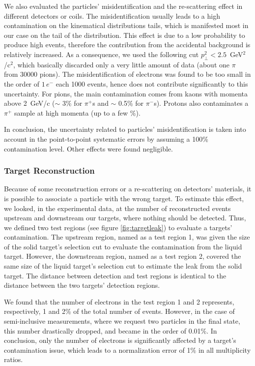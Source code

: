 We also evaluated the particles' misidentification and the re-scattering effect in different detectors or coils. The misidentification usually leads to a high 
contamination on the kinematical distributions tails, which is manifested most in our case on the tail of the \pt distribution. This effect is due to a low probability to produce high \pt events, therefore the contribution from the accidental background is relatively increased. As a consequence, we used the following cut $p_\perp^2 < 2.5$~GeV$^2$/c$^2$, which basically discarded only a very little amount of data (about one $\pi$ from 30000 pions). The misidentification of electrons was found to be too small in the order of $1\,e^-$ each 1000 events, hence does not contribute significantly to this uncertainty. For pions, the main contamination comes from kaons with momenta above 2~GeV/c ($\sim$ 3\% for $\pi^+$s and $\sim$ 0.5\% for $\pi^-$s). Protons also contaminates a $\pi^+$ sample at high momenta (up to a few \%). 

In conclusion, the uncertainty related to particles' misidentification is taken into account in the point-to-point systematic errors by assuming a 100\% contamination level. Other effects were found negligible.

\subsubsection{Target Reconstruction}

Because of some reconstruction errors or a re-scattering on detectors' materials, it 
is possible to associate a particle with the wrong target. To estimate this 
effect, we looked, in the experimental data, at the number of reconstructed events upstream and downstream our targets, where nothing should be detected. Thus, we defined two test regions (see figure \ref{fig:targetleak}) to evaluate a targets' contamination. The upstream region, named as a test region 1, was given the size of the solid target's selection cut to evaluate the contamination from the liquid target. However, the downstream region, named as a test region 2, covered the same size of the liquid target's selection cut to estimate the leak from the solid target. The distance between detection and test regions is identical to the 
distance between the two targets' detection regions. 

We found that the number of electrons in the test region 1 and 2 represents, 
respectively, 1 and 2\% of the total number of events. However, in the case of semi-inclusive measurements, where we request two particles in the final state, this number drastically dropped, and became in the order of 0.01\%. In conclusion, only the number of electrons is significantly affected by a target's contamination issue, which leads to a normalization error of 1\% in all multiplicity ratios.


